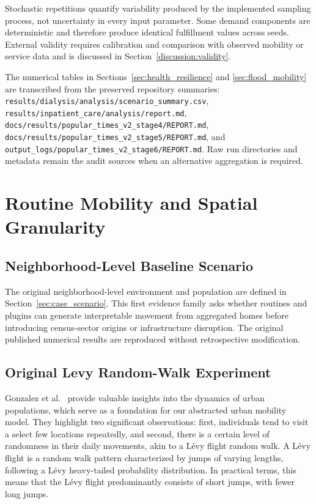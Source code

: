\documentclass[pdflatex,sn-mathphys-num]{sn-jnl}%
\theoremstyle{thmstyleone}%
\theoremstyle{thmstyletwo}%
\theoremstyle{thmstylethree}%
\begin{document}
Stochastic repetitions quantify variability produced by the implemented sampling process, not uncertainty in every input parameter. Some demand components are deterministic and therefore produce identical fulfillment values across seeds. External validity requires calibration and comparison with observed mobility or service data and is discussed in Section~\ref{discussion:validity}.

The numerical tables in Sections~\ref{sec:health_resilience} and \ref{sec:flood_mobility} are transcribed from the preserved repository summaries: \texttt{results/dialysis/analysis/scenario\_summary.csv}, \texttt{results/inpatient\_care/analysis/report.md}, \texttt{docs/results/popular\_times\_v2\_stage4/REPORT.md}, \texttt{docs/results/popular\_times\_v2\_stage5/REPORT.md}, and \texttt{output\_logs/popular\_times\_v2\_stage6/REPORT.md}. Raw run directories and metadata remain the audit sources when an alternative aggregation is required.



\section{Routine Mobility and Spatial Granularity}
\label{sec:routine_mobility}

\subsection{Neighborhood-Level Baseline Scenario}

The original neighborhood-level environment and population are defined in Section~\ref{sec:case_scenario}. This first evidence family asks whether routines and plugins can generate interpretable movement from aggregated homes before introducing census-sector origins or infrastructure disruption. The original published numerical results are reproduced without retrospective modification.

\subsection{Original Levy Random-Walk Experiment}
\label{sec:random_walk}

Gonzalez et al.~\citep{gonzalez2008understanding} provide valuable insights into the dynamics of urban populations, which serve as a foundation for our abstracted urban mobility model. They highlight two significant observations: first, individuals tend to visit a select few locations repeatedly, and second, there is a certain level of randomness in their daily movements, akin to a Lévy flight random walk.
A Lévy flight is a random walk pattern characterized by jumps of varying lengths, following a Lévy heavy-tailed probability distribution. In practical terms, this means that the Lévy flight predominantly consists of short jumps, with fewer long jumps.
\end{document}
